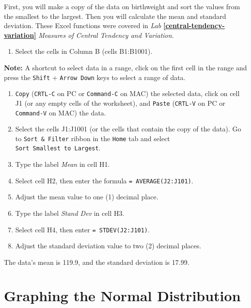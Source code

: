 \documentclass[
]{book}
\providecommand{\tightlist}{%
  \setlength{\itemsep}{0pt}\setlength{\parskip}{0pt}}
\begin{document}
First, you will make a copy of the data on birthweight and sort the values from the smallest to the largest. Then you will calculate the mean and standard deviation. These Excel functions were covered in \emph{Lab} \textbf{\ref{central-tendency-variation}} \emph{Measures of Central Tendency and Variation}.

\begin{enumerate}
\def\labelenumi{\arabic{enumi}.}
\tightlist
\item
  Select the cells in Column B (cells B1:B1001).
\end{enumerate}

\textbf{Note:} A shortcut to select data in a range, click on the first cell in the range and press the \texttt{Shift} + \texttt{Arrow\ Down} keys to select a range of data.

\begin{enumerate}
\def\labelenumi{\arabic{enumi}.}
\setcounter{enumi}{1}
\tightlist
\item
  \texttt{Copy} (\texttt{CRTL-C} on PC or \texttt{Command-C} on MAC) the selected data, click on cell J1 (or any empty cells of the worksheet), and \texttt{Paste} (\texttt{CRTL-V} on PC or \texttt{Command-V} on MAC) the data.
\item
  Select the cells J1:J1001 (or the cells that contain the copy of the data). Go to \texttt{Sort\ \&\ Filter} ribbon in the \texttt{Home} tab and select \texttt{Sort\ Smallest\ to\ Largest}.
\item
  Type the label \emph{Mean} in cell H1.
\item
  Select cell H2, then enter the formula \texttt{=\ AVERAGE(J2:J101)}.
\item
  Adjust the mean value to one (1) decimal place.
\item
  Type the label \emph{Stand Dev} in cell H3.
\item
  Select cell H4, then enter \texttt{=\ STDEV(J2:J101)}.
\item
  Adjust the standard deviation value to two (2) decimal places.
\end{enumerate}

The data's mean is 119.9, and the standard deviation is 17.99.

\hypertarget{graphing-the-normal-distribution}{%
\section{Graphing the Normal Distribution}\label{graphing-the-normal-distribution}}
\end{document}
